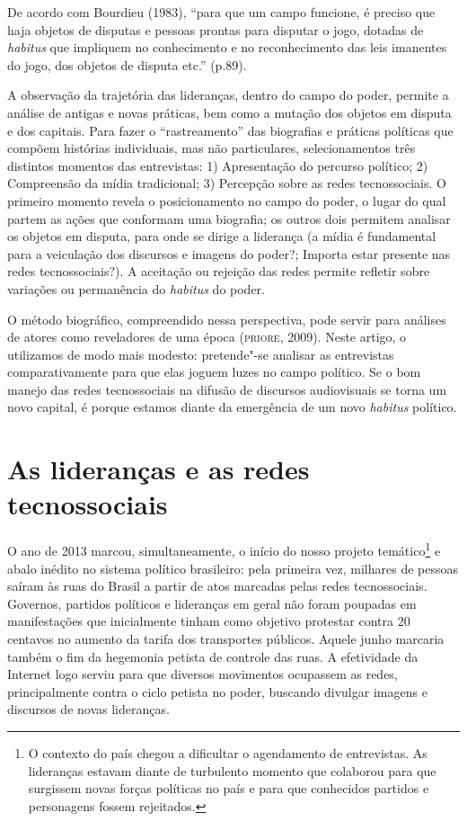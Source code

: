 De acordo com Bourdieu (1983), ``para que um campo funcione, é preciso
que haja objetos de disputas e pessoas prontas para disputar o jogo,
dotadas de \emph{habitus} que impliquem no conhecimento e no
reconhecimento das leis imanentes do jogo, dos objetos de disputa etc.''
(p.89).

A observação da trajetória das lideranças, dentro do campo do poder,
permite a análise de antigas e novas práticas, bem como a mutação dos
objetos em disputa e dos capitais. Para fazer o ``rastreamento'' das
biografias e práticas políticas que compõem histórias individuais, mas
não particulares, selecionamentos três distintos momentos das
entrevistas: 1) Apresentação do percurso político; 2) Compreensão da
mídia tradicional; 3) Percepção sobre as redes tecnossociais. O primeiro
momento revela o posicionamento no campo do poder, o lugar do qual
partem as ações que conformam uma biografia; os outros dois permitem
analisar os objetos em disputa, para onde se dirige a liderança (a mídia
é fundamental para a veiculação dos discursos e imagens do poder?;
Importa estar presente nas redes tecnossociais?). A aceitação ou
rejeição das redes permite refletir sobre variações ou permanência do
\emph{habitus} do poder.

O método biográfico, compreendido nessa perspectiva, pode servir para
análises de atores como reveladores de uma época (\textsc{priore}, 2009). Neste
artigo, o utilizamos de modo mais modesto: pretende"-se analisar as
entrevistas comparativamente para que elas joguem luzes no campo
político. Se o bom manejo das redes tecnossociais na difusão de
discursos audiovisuais se torna um novo capital, é porque estamos diante
da emergência de um novo \emph{habitus} político.

\section{As lideranças e as redes tecnossociais}

\noindent{}O ano de 2013 marcou, simultaneamente, o início do nosso projeto
temático\footnote{O contexto do país chegou a dificultar o agendamento
  de entrevistas. As lideranças estavam diante de turbulento momento que
  colaborou para que surgissem novas forças políticas no país e para que
  conhecidos partidos e personagens fossem rejeitados.} e abalo inédito
no sistema político brasileiro: pela primeira vez, milhares de pessoas
saíram às ruas do Brasil a partir de atos marcadas pelas redes
tecnossociais. Governos, partidos políticos e lideranças em geral não
foram poupadas em manifestações que inicialmente tinham como objetivo
protestar contra 20 centavos no aumento da tarifa dos transportes
públicos. Aquele junho marcaria também o fim da hegemonia petista de
controle das ruas. A efetividade da Internet logo serviu para que
diversos movimentos ocupassem as redes, principalmente contra o ciclo
petista no poder, buscando divulgar imagens e discursos de novas
lideranças.

